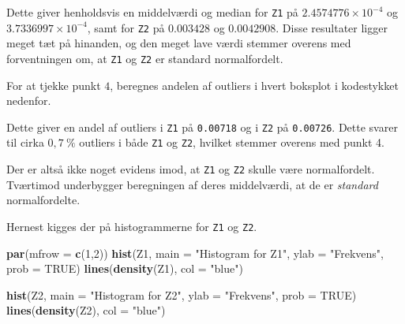 \documentclass[
]{book}
\newenvironment{Shaded}{\begin{snugshade}}{\end{snugshade}}
\newcommand{\DataTypeTok}[1]{\textcolor[rgb]{0.13,0.29,0.53}{#1}}
\newcommand{\DecValTok}[1]{\textcolor[rgb]{0.00,0.00,0.81}{#1}}
\newcommand{\KeywordTok}[1]{\textcolor[rgb]{0.13,0.29,0.53}{\textbf{#1}}}
\newcommand{\NormalTok}[1]{#1}
\newcommand{\OperatorTok}[1]{\textcolor[rgb]{0.81,0.36,0.00}{\textbf{#1}}}
\newcommand{\OtherTok}[1]{\textcolor[rgb]{0.56,0.35,0.01}{#1}}
\newcommand{\StringTok}[1]{\textcolor[rgb]{0.31,0.60,0.02}{#1}}
\theoremstyle{definition}
\theoremstyle{definition}
\theoremstyle{definition}
\theoremstyle{remark}
\begin{document}
Dette giver henholdsvis en middelværdi og median for \texttt{Z1} på \(\ensuremath{2.4574776\times 10^{-4}}\) og \(\ensuremath{3.7336997\times 10^{-4}}\), samt for \texttt{Z2} på \(0.003428\) og \(0.0042908\). Disse resultater ligger meget tæt på hinanden, og den meget lave værdi stemmer overens med forventningen om, at \texttt{Z1} og \texttt{Z2} er standard normalfordelt.

For at tjekke punkt \(4\), beregnes andelen af outliers i hvert boksplot i kodestykket nedenfor.

\begin{Shaded}
\end{Shaded}

Dette giver en andel af outliers i \texttt{Z1} på \texttt{0.00718} og i \texttt{Z2} på \texttt{0.00726}. Dette svarer til cirka \(0,7~ \%\) outliers i både \texttt{Z1} og \texttt{Z2}, hvilket stemmer overens med punkt 4.

Der er altså ikke noget evidens imod, at \texttt{Z1} og \texttt{Z2} skulle være normalfordelt. Tværtimod underbygger beregningen af deres middelværdi, at de er \emph{standard} normalfordelte.

Hernest kigges der på histogrammerne for \texttt{Z1} og \texttt{Z2}.

\begin{Shaded}
\begin{Highlighting}[]
\KeywordTok{par}\NormalTok{(}\DataTypeTok{mfrow =} \KeywordTok{c}\NormalTok{(}\DecValTok{1}\NormalTok{,}\DecValTok{2}\NormalTok{))}
\KeywordTok{hist}\NormalTok{(Z1, }\DataTypeTok{main =} \StringTok{"Histogram for Z1"}\NormalTok{, }\DataTypeTok{ylab =} \StringTok{"Frekvens"}\NormalTok{, }\DataTypeTok{prob =} \OtherTok{TRUE}\NormalTok{)}
\KeywordTok{lines}\NormalTok{(}\KeywordTok{density}\NormalTok{(Z1), }\DataTypeTok{col =} \StringTok{"blue"}\NormalTok{)}

\KeywordTok{hist}\NormalTok{(Z2, }\DataTypeTok{main =} \StringTok{"Histogram for Z2"}\NormalTok{, }\DataTypeTok{ylab =} \StringTok{"Frekvens"}\NormalTok{, }\DataTypeTok{prob =} \OtherTok{TRUE}\NormalTok{)}
\KeywordTok{lines}\NormalTok{(}\KeywordTok{density}\NormalTok{(Z2), }\DataTypeTok{col =} \StringTok{"blue"}\NormalTok{)}
\end{Highlighting}
\end{Shaded}
\end{document}
